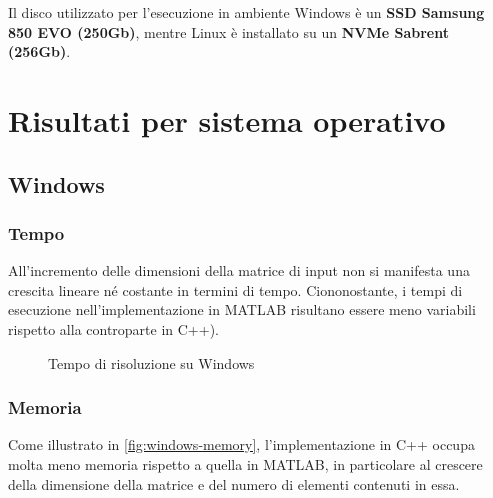 \documentclass[11pt,italian]{article}
\begin{document}
\noindent
Il disco utilizzato per l'esecuzione in ambiente Windows è un \textbf{SSD Samsung 850 EVO (250Gb)}, mentre Linux è installato su un \textbf{NVMe Sabrent (256Gb)}.

\newpage
\section{Risultati per sistema operativo}
\label{section-results-impl}

\subsection{Windows}
\subsubsection*{Tempo}
All'incremento delle dimensioni della matrice di input non si manifesta una crescita lineare né costante in termini di tempo.
Ciononostante, i tempi di esecuzione nell'implementazione in MATLAB risultano essere meno variabili rispetto alla controparte in C++).
\begin{figure}[H]
    \caption{Tempo di risoluzione su Windows}
    \label{fig:windows-time}
\end{figure}

\smallskip
\subsubsection*{Memoria}
Come illustrato in \cref{fig:windows-memory}, l'implementazione in C++ occupa molta meno memoria rispetto a quella in MATLAB, in particolare al crescere della dimensione della matrice e del numero di elementi contenuti in essa.
\end{document}
